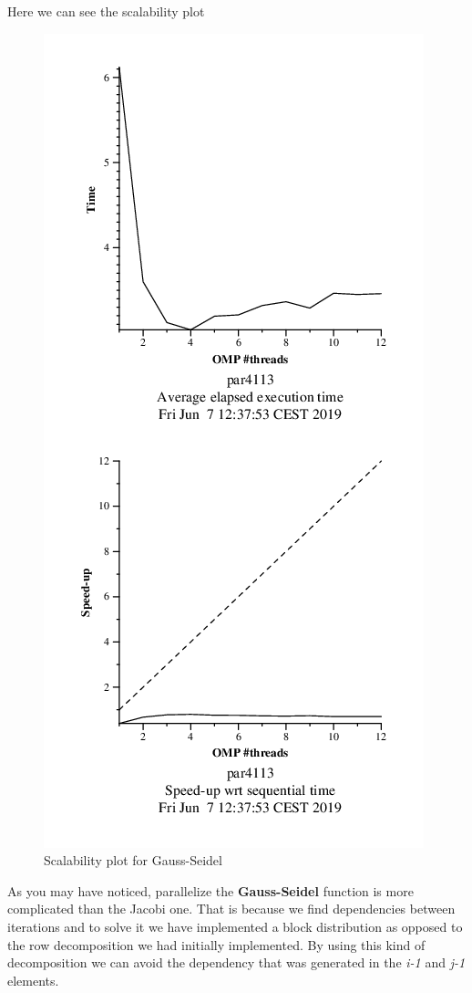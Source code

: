 \documentclass[12]{article}
\begin{document}
Here we can see the scalability plot
\begin{figure}[H]
    \centering
    \includegraphics[scale=0.50]{images/heat-omp-strongGauss.PNG}
    \caption{Scalability plot for Gauss-Seidel}
    \label{scalability_gauss}
\end{figure}


As you may have noticed, parallelize the \textbf{Gauss-Seidel} function is more complicated than the Jacobi one. That is because we find dependencies between iterations and to solve it we have implemented a block distribution as opposed to the row decomposition we had initially implemented. By using this kind of decomposition we can avoid the dependency that was generated in the \textit{i-1} and \textit{j-1} elements. 
\end{document}
